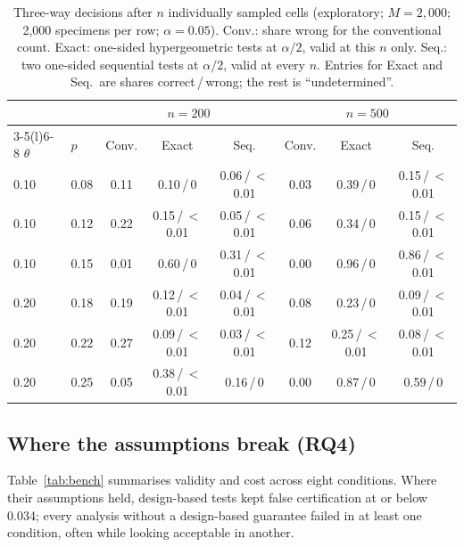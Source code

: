 \documentclass[preprint,12pt]{elsarticle}
\theoremstyle{remark}
\theoremstyle{definition}
\begin{document}
\begin{table}[!htbp]
\centering\small
\caption{Three-way decisions after $n$ individually sampled cells (exploratory; $M=2{,}000$; 2,000 specimens per row; $\alpha=0.05$). Conv.: share wrong for the conventional count. Exact: one-sided hypergeometric tests at $\alpha/2$, valid at this $n$ only. Seq.: two one-sided sequential tests at $\alpha/2$, valid at every $n$. Entries for Exact and Seq.\ are shares correct\,/\,wrong; the rest is ``undetermined''.}\label{tab:decision}
\begin{tabular}{@{}llcccccc@{}}
\toprule
 & & \multicolumn{3}{c}{$n=200$} & \multicolumn{3}{c}{$n=500$}\\
\cmidrule(lr){3-5}\cmidrule(l){6-8}
$\theta$ & $p$ & Conv. & Exact & Seq. & Conv. & Exact & Seq.\\
\midrule
0.10 & 0.08 & 0.11 & 0.10\,/\,0 & 0.06\,/\,$<$0.01 & 0.03 & 0.39\,/\,0 & 0.15\,/\,$<$0.01\\
0.10 & 0.12 & 0.22 & 0.15\,/\,$<$0.01 & 0.05\,/\,$<$0.01 & 0.06 & 0.34\,/\,0 & 0.15\,/\,$<$0.01\\
0.10 & 0.15 & 0.01 & 0.60\,/\,0 & 0.31\,/\,$<$0.01 & 0.00 & 0.96\,/\,0 & 0.86\,/\,$<$0.01\\
0.20 & 0.18 & 0.19 & 0.12\,/\,$<$0.01 & 0.04\,/\,$<$0.01 & 0.08 & 0.23\,/\,0 & 0.09\,/\,$<$0.01\\
0.20 & 0.22 & 0.27 & 0.09\,/\,$<$0.01 & 0.03\,/\,$<$0.01 & 0.12 & 0.25\,/\,$<$0.01 & 0.08\,/\,$<$0.01\\
0.20 & 0.25 & 0.05 & 0.38\,/\,$<$0.01 & 0.16\,/\,0 & 0.00 & 0.87\,/\,0 & 0.59\,/\,0\\
\bottomrule
\end{tabular}
\end{table}

\subsection{Where the assumptions break (RQ4)}\label{sec:rq4}
Table~\ref{tab:bench} summarises validity and cost across eight conditions. Where their assumptions held, design-based tests kept false certification at or below 0.034; every analysis without a design-based guarantee failed in at least one condition, often while looking acceptable in another.
\end{document}
